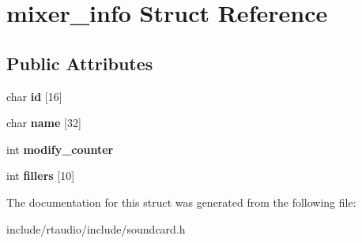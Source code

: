\hypertarget{structmixer__info}{}\section{mixer\+\_\+info Struct Reference}
\label{structmixer__info}
\subsection*{Public Attributes}
\begin{DoxyCompactItemize}
\item 
char {\bfseries id} \mbox{[}16\mbox{]}\hypertarget{structmixer__info_ad6d418426ad3e1412420a4264889e281}{}\label{structmixer__info_ad6d418426ad3e1412420a4264889e281}

\item 
char {\bfseries name} \mbox{[}32\mbox{]}\hypertarget{structmixer__info_a98a2964124f78aaaeab8bd4f6a199250}{}\label{structmixer__info_a98a2964124f78aaaeab8bd4f6a199250}

\item 
int {\bfseries modify\+\_\+counter}\hypertarget{structmixer__info_a60f863ec70f83d7c76a41db5f8c7af66}{}\label{structmixer__info_a60f863ec70f83d7c76a41db5f8c7af66}

\item 
int {\bfseries fillers} \mbox{[}10\mbox{]}\hypertarget{structmixer__info_a5562b2c2cb479b955282f572d9a1a9a2}{}\label{structmixer__info_a5562b2c2cb479b955282f572d9a1a9a2}

\end{DoxyCompactItemize}


The documentation for this struct was generated from the following file\+:\begin{DoxyCompactItemize}
\item 
include/rtaudio/include/soundcard.\+h\end{DoxyCompactItemize}
